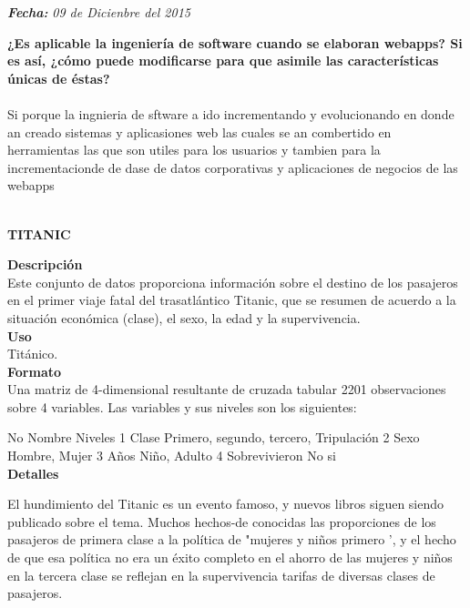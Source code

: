 \documentclass[a4paper,openright,12pt]{report}
\begin{document}
{\begin{flushleft}
\textit{\textbf{Fecha:}}
\textit{09 de Dicienbre del 2015}
\end{flushleft}
\thinspace
\bigskip

\newpage

\textbf{¿Es aplicable la ingeniería de software cuando se elaboran webapps? Si es así, ¿cómo puede
modificarse para que asimile las características únicas de éstas?}
\\ \\
Si porque la ingnieria de sftware a ido incrementando y evolucionando en donde an creado sistemas y aplicasiones web las cuales se an combertido en herramientas las que son utiles para los usuarios y tambien para la incrementacionde de dase de datos corporativas y aplicaciones de negocios de las webapps
\\\\
\begin{center}\textbf{\Large TITANIC}\end{center}

\textbf{Descripción}\\

Este conjunto de datos proporciona información sobre el destino de los pasajeros en el primer viaje fatal del trasatlántico Titanic, que se resumen de acuerdo a la situación económica (clase), el sexo, la edad y la supervivencia.\\

\textbf{Uso}\\

Titánico.\\

\textbf{Formato}\\

Una matriz de 4-dimensional resultante de cruzada tabular 2201 observaciones sobre 4 variables. Las variables y sus niveles son los siguientes:

No	Nombre	Niveles
1	Clase	Primero, segundo, tercero, Tripulación
2	Sexo	Hombre, Mujer
3	Años	Niño, Adulto
4	Sobrevivieron	No si\\


\textbf{Detalles}

El hundimiento del Titanic es un evento famoso, y nuevos libros siguen siendo publicado sobre el tema. Muchos hechos-de conocidas las proporciones de los pasajeros de primera clase a la política de "mujeres y niños primero ', y el hecho de que esa política no era un éxito completo en el ahorro de las mujeres y niños en la tercera clase se reflejan en la supervivencia tarifas de diversas clases de pasajeros.

}
\end{document}
